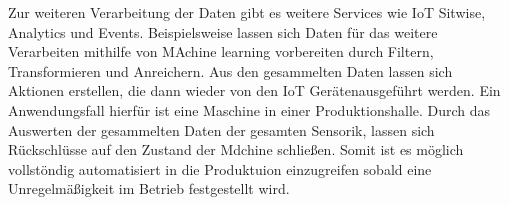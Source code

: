 Zur weiteren Verarbeitung der Daten gibt es weitere Services wie IoT Sitwise, Analytics und Events. Beispielsweise lassen sich Daten für das weitere Verarbeiten mithilfe von MAchine learning vorbereiten durch Filtern, Transformieren und Anreichern. Aus den gesammelten Daten lassen sich Aktionen erstellen, die dann wieder von den IoT Gerätenausgeführt werden. Ein Anwendungsfall hierfür ist eine Maschine in einer Produktionshalle. Durch das Auswerten der gesammelten Daten der gesamten Sensorik, lassen sich Rückschlüsse auf den Zustand der Mdchine schließen. Somit ist es möglich vollstöndig automatisiert in die Produktuion einzugreifen sobald eine Unregelmäßigkeit im Betrieb festgestellt wird.